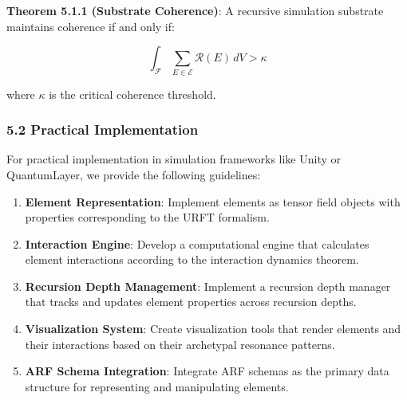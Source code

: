 \documentclass[
]{article}
\begin{document}
\textbf{Theorem 5.1.1 (Substrate Coherence)}: A recursive simulation
substrate maintains coherence if and only if:

\[\int_{\mathcal{F}} \sum_{E \in \mathcal{E}} \mathcal{R}(E) \, dV > \kappa\]

where \(\kappa\) is the critical coherence threshold.

\subsubsection{5.2 Practical
Implementation}\label{practical-implementation}

For practical implementation in simulation frameworks like Unity or
QuantumLayer, we provide the following guidelines:

\begin{enumerate}
\def\labelenumi{\arabic{enumi}.}
\item
  \textbf{Element Representation}: Implement elements as tensor field
  objects with properties corresponding to the URFT formalism.
\item
  \textbf{Interaction Engine}: Develop a computational engine that
  calculates element interactions according to the interaction dynamics
  theorem.
\item
  \textbf{Recursion Depth Management}: Implement a recursion depth
  manager that tracks and updates element properties across recursion
  depths.
\item
  \textbf{Visualization System}: Create visualization tools that render
  elements and their interactions based on their archetypal resonance
  patterns.
\item
  \textbf{ARF Schema Integration}: Integrate ARF schemas as the primary
  data structure for representing and manipulating elements.
\end{enumerate}
\end{document}
